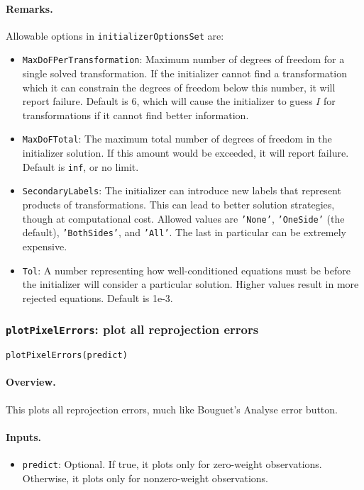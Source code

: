 \paragraph{Remarks.} Allowable options in \texttt{initializerOptionsSet} are:
\begin{itemize}
	\item \texttt{MaxDoFPerTransformation}: Maximum number of degrees of freedom for a single solved
		transformation. If the initializer cannot find a transformation which it can constrain
		the degrees of freedom below this number, it will report failure. Default is 6, 
		which will cause the initializer to guess $I$ for transformations if it cannot find 
		better information.
	\item \texttt{MaxDoFTotal}: The maximum total number of degrees of freedom in the initializer solution.
		If this amount would be exceeded, it will report failure. Default is \texttt{inf}, or no limit. 
	\item \texttt{SecondaryLabels}: The initializer can introduce new labels that represent products
		of transformations. This can lead to better solution strategies, though at computational cost.
		Allowed values are \texttt{'None'}, \texttt{'OneSide'} (the default), 
		\texttt{'BothSides'}, and \texttt{'All'}. The last in particular can be extremely expensive.
	\item \texttt{Tol}: A number representing how well-conditioned equations must be before the 
		initializer will consider a particular solution. Higher values result in more rejected
		equations. Default is 1e-3.
\end{itemize}

\subsubsection{\texttt{plotPixelErrors}: plot all reprojection errors}
\texttt{plotPixelErrors(predict)}
\paragraph{Overview.}
This plots all reprojection errors, much like Bouguet's \textsf{Analyse error}
button.
\paragraph{Inputs.}
\begin{itemize}
	\item \texttt{predict}: Optional. If true, it plots only for zero-weight 
		observations. Otherwise, it plots only for nonzero-weight observations.
\end{itemize}
